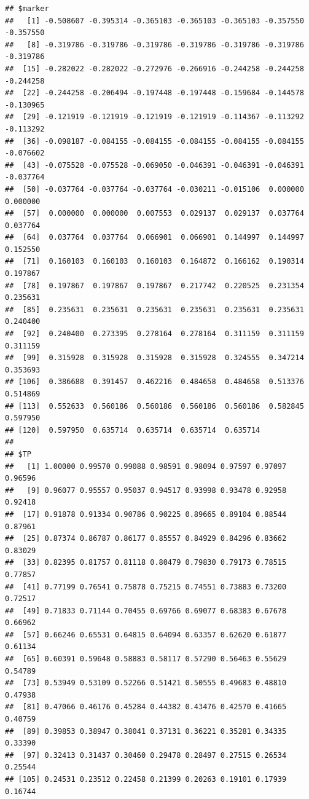 \documentclass{article}\usepackage[]{graphicx}\usepackage[]{color}
\makeatletter
\newenvironment{kframe}{%
 \def\at@end@of@kframe{}%
 \ifinner\ifhmode%
  \def\at@end@of@kframe{\end{minipage}}%
  \begin{minipage}{\columnwidth}%
 \fi\fi%
 \def\FrameCommand##1{\hskip\@totalleftmargin \hskip-\fboxsep
 \colorbox{shadecolor}{##1}\hskip-\fboxsep
     \hskip-\linewidth \hskip-\@totalleftmargin \hskip\columnwidth}%
 \MakeFramed {\advance\hsize-\width
   \@totalleftmargin\z@ \linewidth\hsize
   \@setminipage}}%
 {\par\unskip\endMakeFramed%
 \at@end@of@kframe}
\newenvironment{knitrout}{}{} %
\makeatother
\begin{document}
\begin{knitrout}
{}


\begin{kframe}\begin{verbatim}
## $marker
##   [1] -0.508607 -0.395314 -0.365103 -0.365103 -0.365103 -0.357550 -0.357550
##   [8] -0.319786 -0.319786 -0.319786 -0.319786 -0.319786 -0.319786 -0.319786
##  [15] -0.282022 -0.282022 -0.272976 -0.266916 -0.244258 -0.244258 -0.244258
##  [22] -0.244258 -0.206494 -0.197448 -0.197448 -0.159684 -0.144578 -0.130965
##  [29] -0.121919 -0.121919 -0.121919 -0.121919 -0.114367 -0.113292 -0.113292
##  [36] -0.098187 -0.084155 -0.084155 -0.084155 -0.084155 -0.084155 -0.076602
##  [43] -0.075528 -0.075528 -0.069050 -0.046391 -0.046391 -0.046391 -0.037764
##  [50] -0.037764 -0.037764 -0.037764 -0.030211 -0.015106  0.000000  0.000000
##  [57]  0.000000  0.000000  0.007553  0.029137  0.029137  0.037764  0.037764
##  [64]  0.037764  0.037764  0.066901  0.066901  0.144997  0.144997  0.152550
##  [71]  0.160103  0.160103  0.160103  0.164872  0.166162  0.190314  0.197867
##  [78]  0.197867  0.197867  0.197867  0.217742  0.220525  0.231354  0.235631
##  [85]  0.235631  0.235631  0.235631  0.235631  0.235631  0.235631  0.240400
##  [92]  0.240400  0.273395  0.278164  0.278164  0.311159  0.311159  0.311159
##  [99]  0.315928  0.315928  0.315928  0.315928  0.324555  0.347214  0.353693
## [106]  0.386688  0.391457  0.462216  0.484658  0.484658  0.513376  0.514869
## [113]  0.552633  0.560186  0.560186  0.560186  0.560186  0.582845  0.597950
## [120]  0.597950  0.635714  0.635714  0.635714  0.635714
## 
## $TP
##   [1] 1.00000 0.99570 0.99088 0.98591 0.98094 0.97597 0.97097 0.96596
##   [9] 0.96077 0.95557 0.95037 0.94517 0.93998 0.93478 0.92958 0.92418
##  [17] 0.91878 0.91334 0.90786 0.90225 0.89665 0.89104 0.88544 0.87961
##  [25] 0.87374 0.86787 0.86177 0.85557 0.84929 0.84296 0.83662 0.83029
##  [33] 0.82395 0.81757 0.81118 0.80479 0.79830 0.79173 0.78515 0.77857
##  [41] 0.77199 0.76541 0.75878 0.75215 0.74551 0.73883 0.73200 0.72517
##  [49] 0.71833 0.71144 0.70455 0.69766 0.69077 0.68383 0.67678 0.66962
##  [57] 0.66246 0.65531 0.64815 0.64094 0.63357 0.62620 0.61877 0.61134
##  [65] 0.60391 0.59648 0.58883 0.58117 0.57290 0.56463 0.55629 0.54789
##  [73] 0.53949 0.53109 0.52266 0.51421 0.50555 0.49683 0.48810 0.47938
##  [81] 0.47066 0.46176 0.45284 0.44382 0.43476 0.42570 0.41665 0.40759
##  [89] 0.39853 0.38947 0.38041 0.37131 0.36221 0.35281 0.34335 0.33390
##  [97] 0.32413 0.31437 0.30460 0.29478 0.28497 0.27515 0.26534 0.25544
## [105] 0.24531 0.23512 0.22458 0.21399 0.20263 0.19101 0.17939 0.16744

\end{verbatim}
\end{kframe}
\end{knitrout}
\end{document}
